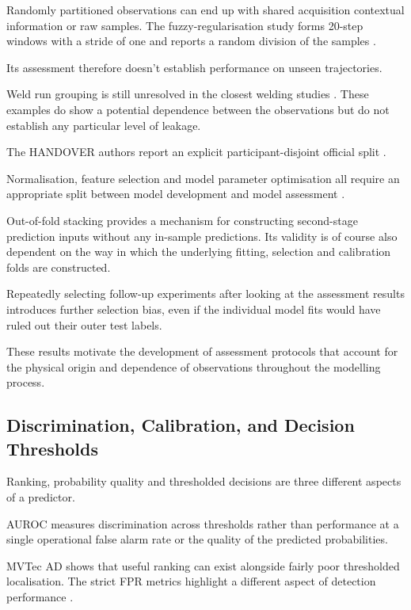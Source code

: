 Randomly partitioned observations can end up with shared acquisition contextual information or raw
samples. The fuzzy-regularisation study forms 20-step windows with a stride of one and reports a random
division of the samples \parencite[Sections~IV.A--IV.B]{Altinses2023Fuzzy}.

Its assessment therefore doesn't establish performance on unseen trajectories.

Weld run grouping is still unresolved in the closest welding studies \parencite{P003,Hua2026Weld}. These
examples do show a potential dependence between the observations but do not establish any particular
level of leakage.

The HANDOVER authors report an explicit participant-disjoint official split \parencite{Thoduka2024Handover}.

Normalisation, feature selection and model parameter optimisation all require an appropriate split
between model development and model assessment \parencite{P004,P017}.

Out-of-fold stacking provides a mechanism for constructing second-stage prediction inputs without
any in-sample predictions. Its validity is of course also dependent on the way in which the
underlying fitting, selection and calibration folds are constructed.

Repeatedly selecting follow-up experiments after looking at the assessment results introduces
further selection bias, even if the individual model fits would have ruled out their outer test
labels.

These results motivate the development of assessment protocols that account for the physical origin
and dependence of observations throughout the modelling process.

\subsection{Discrimination, Calibration, and Decision Thresholds}

Ranking, probability quality and thresholded decisions are three different aspects of a predictor.

AUROC measures discrimination across thresholds rather than performance at a single operational
false alarm rate or the quality of the predicted probabilities.

MVTec AD shows that useful ranking can exist alongside fairly poor thresholded localisation. The
strict FPR metrics highlight a different aspect of detection performance
\parencite{Bergmann2019MVTec,Costanzino2024Multimodal,Cheng2025Multimodal}.

